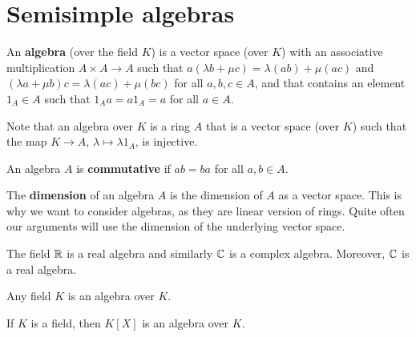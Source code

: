 \chapter{Semisimple algebras}



\begin{definition}
	An \textbf{algebra} (over the field $K$) is a vector space (over $K$) 
	with an associative multiplication $A\times A\to A$ such that
	$a(\lambda b+\mu c)=\lambda(ab)+\mu(ac)$ and
	$(\lambda a+\mu b)c=\lambda(ac)+\mu (bc)$ for all $a,b,c\in A$, and 
	that contains an element $1_A\in A$ such that $1_Aa=a1_A=a$ for all $a\in A$.   
\end{definition}

Note that an algebra over $K$ is a ring $A$ that is a vector space
(over $K$) such that the map $K\to A$, $\lambda\mapsto \lambda1_A$, is injective. 

\begin{definition}
	An algebra $A$ is \textbf{commutative} if $ab=ba$ for all $a,b\in A$. 
\end{definition}

The \textbf{dimension} of an algebra $A$ is the dimension of $A$ as a vector space. This is why we want to consider algebras, as 
they are linear version of rings. Quite often our arguments will use the dimension of the underlying vector space.  

\begin{example}
	The field $\mathbb{R}$ is a real algebra and similarly 
	$\mathbb{C}$ is a complex algebra. Moreover, $\mathbb{C}$ is a real algebra. 
\end{example}

Any field $K$ is an algebra over $K$.

\begin{example}
	If $K$ is a field, then $K[X]$ is an algebra over $K$. 
\end{example}

